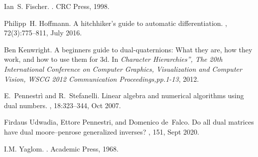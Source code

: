 \documentclass[
]{article}
\theoremstyle{theorem}
\theoremstyle{proposition}
\begin{document}
\begin{thebibliography}{1}

  Ian~S. Fischer.
  .
  \newblock CRC Press, 1998.
  
  Philipp~H. Hoffmann.
  \newblock A hitchhiker’s guide to automatic differentiation.
  , 72(3):775–811, July 2016.
  
  Ben Kenwright.
  \newblock A beginners guide to dual-quaternions: What they are, how they work,
    and how to use them for 3d.
  \newblock In {\em Character Hierarchies”, The 20th International Conference
    on Computer Graphics, Visualization and Computer Vision, WSCG 2012
    Communication Proceedings,pp.1-13}, 2012.
  
  E.~Pennestrì and R.~Stefanelli.
  \newblock Linear algebra and numerical algorithms using dual numbers.
  , 18:323--344, Oct 2007.
  
  Firdaus Udwadia, Ettore Pennestri, and Domenico de~Falco.
  \newblock Do all dual matrices have dual moore–penrose generalized inverses?
  , 151, Sept 2020.
  
  I.M. Yaglom.
  .
  \newblock Academic Press, 1968.
  
  \end{thebibliography}
\end{document}
